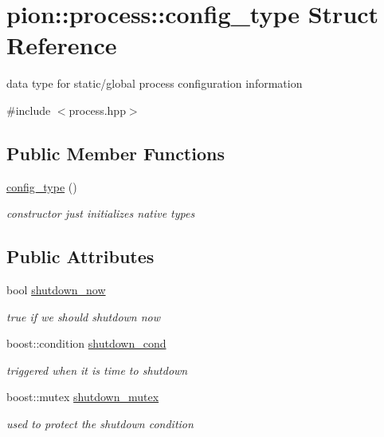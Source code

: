 \hypertarget{structpion_1_1process_1_1config__type}{\section{pion\-:\-:process\-:\-:config\-\_\-type Struct Reference}
\label{structpion_1_1process_1_1config__type}
}


data type for static/global process configuration information  




{\ttfamily \#include $<$process.\-hpp$>$}

\subsection*{Public Member Functions}
\begin{DoxyCompactItemize}
\item 
\hyperlink{structpion_1_1process_1_1config__type_a89ae5c8f99282b03c22006ce00c619e2}{config\-\_\-type} ()
\begin{DoxyCompactList}\small\item\em constructor just initializes native types \end{DoxyCompactList}\end{DoxyCompactItemize}
\subsection*{Public Attributes}
\begin{DoxyCompactItemize}
\item 
bool \hyperlink{structpion_1_1process_1_1config__type_aea142e63e9a962ffefb5c0d2091ed303}{shutdown\-\_\-now}
\begin{DoxyCompactList}\small\item\em true if we should shutdown now \end{DoxyCompactList}\item 
boost\-::condition \hyperlink{structpion_1_1process_1_1config__type_aec765e2fe0c8e6a474c78c2511079957}{shutdown\-\_\-cond}
\begin{DoxyCompactList}\small\item\em triggered when it is time to shutdown \end{DoxyCompactList}\item 
boost\-::mutex \hyperlink{structpion_1_1process_1_1config__type_aeea8f463fcb510add8cab8e5fa20f0e4}{shutdown\-\_\-mutex}
\begin{DoxyCompactList}\small\item\em used to protect the shutdown condition \end{DoxyCompactList}\end{DoxyCompactItemize}


